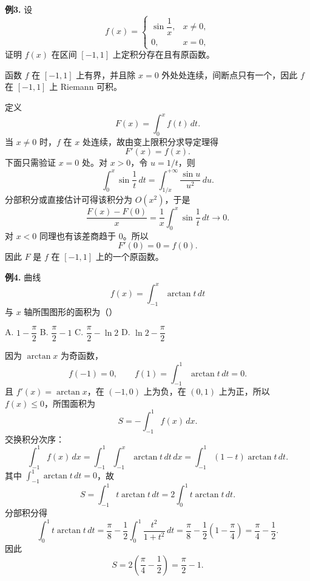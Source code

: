 \begin{problemblock}
\textbf{例3.} 设
\[
f(x)=\begin{cases}
\sin\dfrac1x,&x\ne0,\\
0,&x=0,
\end{cases}
\]
证明 \(f(x)\) 在区间 \([-1,1]\) 上定积分存在且有原函数。
\end{problemblock}
\begin{solutionblock}
函数 \(f\) 在 \([-1,1]\) 上有界，并且除 \(x=0\) 外处处连续，间断点只有一个，因此 \(f\) 在 \([-1,1]\) 上 Riemann 可积。

定义
\[
F(x)=\int_0^x f(t)\,dt.
\]
当 \(x\ne0\) 时，\(f\) 在 \(x\) 处连续，故由变上限积分求导定理得
\[
F'(x)=f(x).
\]
下面只需验证 \(x=0\) 处。对 \(x>0\)，令 \(u=1/t\)，则
\[
\int_0^x \sin\frac1t\,dt
=\int_{1/x}^{+\infty}\frac{\sin u}{u^2}\,du.
\]
分部积分或直接估计可得该积分为 \(O(x^2)\)，于是
\[
\frac{F(x)-F(0)}x
=\frac1x\int_0^x \sin\frac1t\,dt\to0.
\]
对 \(x<0\) 同理也有该差商趋于 \(0\)。所以
\[
F'(0)=0=f(0).
\]
因此 \(F\) 是 \(f\) 在 \([-1,1]\) 上的一个原函数。
\end{solutionblock}

\begin{problemblock}
\textbf{例4.} 曲线
\[
f(x)=\int_{-1}^x\arctan t\,dt
\]
与 \(x\) 轴所围图形的面积为（\quad）

A. \(1-\dfrac\pi2\)\qquad
B. \(\dfrac\pi2-1\)\qquad
C. \(\dfrac\pi2-\ln2\)\qquad
D. \(\ln2-\dfrac\pi2\)
\end{problemblock}
\begin{solutionblock}
因为 \(\arctan x\) 为奇函数，
\[
f(-1)=0,\qquad f(1)=\int_{-1}^1\arctan t\,dt=0.
\]
且 \(f'(x)=\arctan x\)，在 \((-1,0)\) 上为负，在 \((0,1)\) 上为正，所以 \(f(x)\le0\)，所围面积为
\[
S=-\int_{-1}^1 f(x)\,dx.
\]
交换积分次序：
\[
\int_{-1}^1 f(x)\,dx
=\int_{-1}^1\int_{-1}^x\arctan t\,dt\,dx
=\int_{-1}^1(1-t)\arctan t\,dt.
\]
其中 \(\int_{-1}^1\arctan t\,dt=0\)，故
\[
S=\int_{-1}^1 t\arctan t\,dt
=2\int_0^1t\arctan t\,dt.
\]
分部积分得
\[
\int_0^1t\arctan t\,dt
=\frac\pi8-\frac12\int_0^1\frac{t^2}{1+t^2}\,dt
=\frac\pi8-\frac12\left(1-\frac\pi4\right)
=\frac\pi4-\frac12.
\]
因此
\[
S=2\left(\frac\pi4-\frac12\right)=\frac\pi2-1.
\]
\end{solutionblock}

